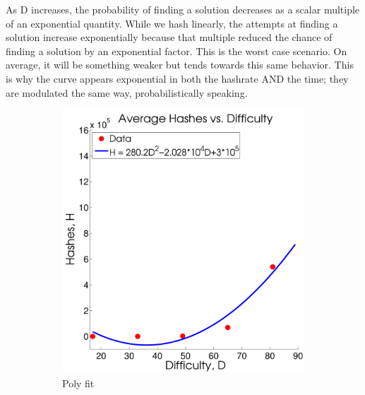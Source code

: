\documentclass[pdftex,11pt]{article}
\begin{document}
As D increases, the probability of finding a solution decreases as a scalar multiple of an exponential quantity. While we hash linearly, the attempts at finding a solution increase exponentially because that multiple reduced the chance of finding a solution by an exponential factor. This is the worst case scenario. On average, it will be something weaker but tends towards this same behavior. This is why the curve appears exponential in both the hashrate AND the time; they are modulated the same way, probabilistically speaking. 

\begin{figure}[H]
	\centering
	\begin{subfigure}[H]{0.4\textwidth}
		\includegraphics[width=\textwidth]{figures/Poly.pdf}
		\caption{Poly fit}
	\end{subfigure}
	\begin{subfigure}[H]{0.4\textwidth}

\end{subfigure}
\end{figure}
\end{document}
